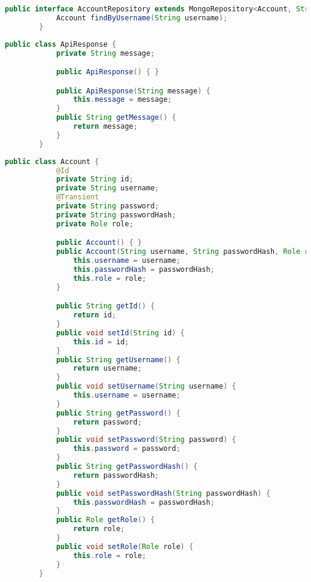     \newpage
    \begin{lstlisting}[language=java]
        public interface AccountRepository extends MongoRepository<Account, String> {
            Account findByUsername(String username);
        }
    \end{lstlisting}

    \begin{lstlisting}[language=java]
        public class ApiResponse {
            private String message;

            public ApiResponse() { }

            public ApiResponse(String message) {
                this.message = message;
            }
            public String getMessage() {
                return message;
            }
        }
    \end{lstlisting}

    \newpage
    \begin{lstlisting}[language=java]
        public class Account {
            @Id
            private String id;
            private String username;
            @Transient
            private String password;
            private String passwordHash;
            private Role role;

            public Account() { }
            public Account(String username, String passwordHash, Role role) {
                this.username = username;
                this.passwordHash = passwordHash;
                this.role = role;
            }

            public String getId() {
                return id;
            }
            public void setId(String id) {
                this.id = id;
            }
            public String getUsername() {
                return username;
            }
            public void setUsername(String username) {
                this.username = username;
            }
            public String getPassword() {
                return password;
            }
            public void setPassword(String password) {
                this.password = password;
            }
            public String getPasswordHash() {
                return passwordHash;
            }
            public void setPasswordHash(String passwordHash) {
                this.passwordHash = passwordHash;
            }
            public Role getRole() {
                return role;
            }
            public void setRole(Role role) {
                this.role = role;
            }
        }
    \end{lstlisting}

